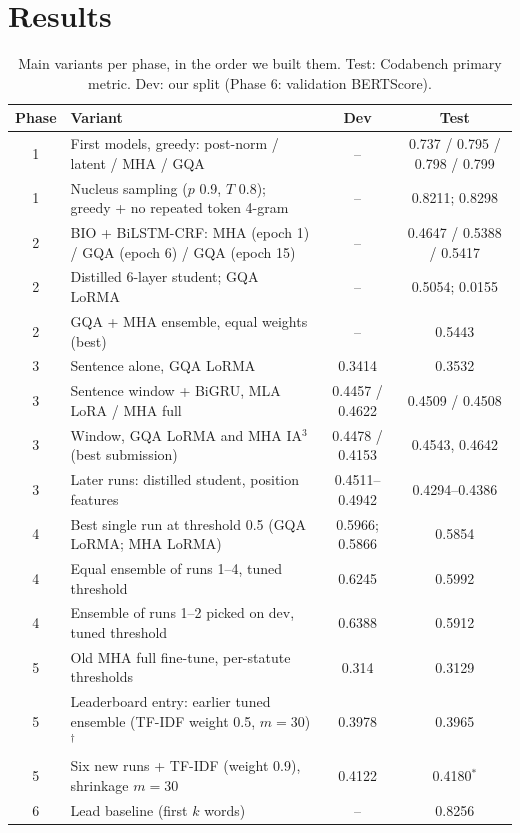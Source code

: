 \documentclass[11pt, oneside]{article}
\begin{document}
\section{Results}\label{sec:results}
\begin{table}[htbp]
\centering\footnotesize
\setlength{\tabcolsep}{4pt}
\caption{Main variants per phase, in the order we built them. Test: Codabench primary metric. Dev: our split (Phase 6: validation BERTScore).}
\label{tab:variants}
\begin{tabularx}{\textwidth}{c>{\raggedright\arraybackslash}Xcc}
\toprule
Phase & Variant & Dev & Test \\
\midrule
1 & First models, greedy: post-norm / latent / MHA / GQA & -- & 0.737 / 0.795 / 0.798 / 0.799 \\
1 & Nucleus sampling ($p$ 0.9, $T$ 0.8); greedy + no repeated token 4-gram & -- & 0.8211; 0.8298 \\
2 & BIO + BiLSTM-CRF: MHA (epoch 1) / GQA (epoch 6) / GQA (epoch 15) & -- & 0.4647 / 0.5388 / 0.5417 \\
2 & Distilled 6-layer student; GQA LoRMA & -- & 0.5054; 0.0155 \\
2 & GQA + MHA ensemble, equal weights (best) & -- & 0.5443 \\
3 & Sentence alone, GQA LoRMA & 0.3414 & 0.3532 \\
3 & Sentence window + BiGRU, MLA LoRA / MHA full & 0.4457 / 0.4622 & 0.4509 / 0.4508 \\
3 & Window, GQA LoRMA and MHA IA$^3$ (best submission) & 0.4478 / 0.4153 & 0.4543, 0.4642 \\
3 & Later runs: distilled student, position features & 0.4511--0.4942 & 0.4294--0.4386 \\
4 & Best single run at threshold 0.5 (GQA LoRMA; MHA LoRMA) & 0.5966; 0.5866 & 0.5854 \\
4 & Equal ensemble of runs 1--4, tuned threshold & 0.6245 & 0.5992 \\
4 & Ensemble of runs 1--2 picked on dev, tuned threshold & 0.6388 & 0.5912 \\
5 & Old MHA full fine-tune, per-statute thresholds & 0.314 & 0.3129 \\
5 & Leaderboard entry: earlier tuned ensemble (TF-IDF weight 0.5, $m=30$)$^\dagger$ & 0.3978 & 0.3965 \\
5 & Six new runs + TF-IDF (weight 0.9), shrinkage $m=30$ & 0.4122 & 0.4180$^\ast$ \\
6 & Lead baseline (first $k$ words) & -- & 0.8256 \\

\end{tabularx}
\end{table}
\end{document}
